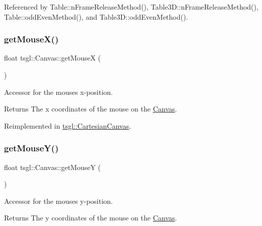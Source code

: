 Referenced by Table\+::n\+Frame\+Release\+Method(), Table3\+D\+::n\+Frame\+Release\+Method(), Table\+::odd\+Even\+Method(), and Table3\+D\+::odd\+Even\+Method().

\mbox{\label{classtsgl_1_1_canvas_aae30eddfb15b6a549dc162e4a11a149d}} 
\subsubsection{\texorpdfstring{get\+Mouse\+X()}{getMouseX()}}
{\footnotesize\ttfamily float tsgl\+::\+Canvas\+::get\+MouseX (\begin{DoxyParamCaption}{ }\end{DoxyParamCaption})\hspace{0.3cm}{\ttfamily [virtual]}}



Accessor for the mouse\textquotesingle{}s x-\/position. 

\begin{DoxyReturn}{Returns}
The x coordinates of the mouse on the \hyperlink{classtsgl_1_1_canvas}{Canvas}. 
\end{DoxyReturn}


Reimplemented in \hyperlink{classtsgl_1_1_cartesian_canvas_afd62dffbd1343ddecdd734a6954f6f87}{tsgl\+::\+Cartesian\+Canvas}.

\mbox{\label{classtsgl_1_1_canvas_a5e86e0938a5c228c1c947f995389bd45}} 
\subsubsection{\texorpdfstring{get\+Mouse\+Y()}{getMouseY()}}
{\footnotesize\ttfamily float tsgl\+::\+Canvas\+::get\+MouseY (\begin{DoxyParamCaption}{ }\end{DoxyParamCaption})\hspace{0.3cm}{\ttfamily [virtual]}}



Accessor for the mouse\textquotesingle{}s y-\/position. 

\begin{DoxyReturn}{Returns}
The y coordinates of the mouse on the \hyperlink{classtsgl_1_1_canvas}{Canvas}. 
\end{DoxyReturn}


